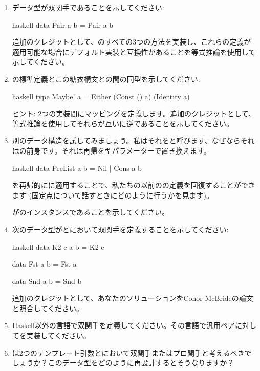 \begin{enumerate}
  \tightlist
  \item
        データ型が双関手であることを示してください: 

        \begin{snip}{haskell}
data Pair a b = Pair a b
\end{snip}

        追加のクレジットとして、のすべての3つの方法を実装し、これらの定義が適用可能な場合にデフォルト実装と互換性があることを等式推論を使用して示してください。
  \item
        の標準定義とこの糖衣構文との間の同型を示してください: 

        \begin{snip}{haskell}
type Maybe' a = Either (Const () a) (Identity a)
\end{snip}

        ヒント: 2つの実装間にマッピングを定義します。追加のクレジットとして、等式推論を使用してそれらが互いに逆であることを示してください。
  \item
        別のデータ構造を試してみましょう。私はそれをと呼びます、なぜならそれはの前身です。それは再帰を型パラメーターで置き換えます。

        \begin{snip}{haskell}
data PreList a b = Nil | Cons a b
\end{snip}

        を再帰的にに適用することで、私たちの以前のの定義を回復することができます (固定点について話すときにどのように行うかを見ます)。

        がのインスタンスであることを示してください。
  \item
        次のデータ型がとにおいて双関手を定義することを示してください: 

        \begin{snip}{haskell}
data K2 c a b = K2 c

data Fst a b = Fst a

data Snd a b = Snd b
\end{snip}

        追加のクレジットとして、あなたのソリューションをConor McBrideの論文と照合してください。
  \item
        Haskell以外の言語で双関手を定義してください。その言語で汎用ペアに対してを実装してください。
  \item
        は2つのテンプレート引数とにおいて双関手またはプロ関手と考えるべきでしょうか？このデータ型をどのように再設計するとそうなりますか？
\end{enumerate}

